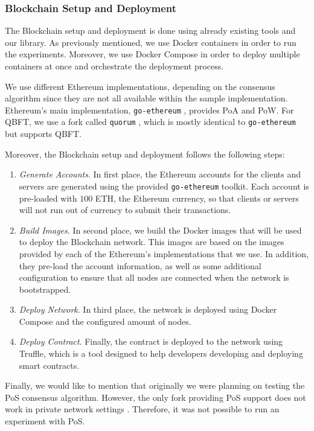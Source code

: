 \subsubsection{Blockchain Setup and Deployment}

The Blockchain setup and deployment is done using already existing tools and our library. As previously mentioned, we use Docker containers in order to run the experiments. Moreover, we use Docker Compose in order to deploy multiple containers at once and orchestrate the deployment process.

We use different Ethereum implementations, depending on the consensus algorithm since they are not all available within the sample implementation. Ethereum's main implementation, \texttt{go-ethereum} \cite{go-ethereum}, provides PoA and PoW. For QBFT, we use a fork called \texttt{quorum} \cite{quorum}, which is mostly identical to \texttt{go-ethereum} but supports QBFT.

Moreover, the Blockchain setup and deployment follows the following steps:

\begin{enumerate}
    \item \textit{Generate Accounts}. In first place, the Ethereum accounts for the clients and servers are generated using the provided \texttt{go-ethereum} toolkit. Each account is pre-loaded with $100$ ETH, the Ethereum currency, so that clients or servers will not run out of currency to submit their transactions.
    
    \item \textit{Build Images}. In second place, we build the Docker images that will be used to deploy the Blockchain network. This images are based on the images provided by each of the Ethereum's implementations that we use. In addition, they pre-load the account information, as well as some additional configuration to ensure that all nodes are connected when the network is bootstrapped.
    
    \item \textit{Deploy Network}. In third place, the network is deployed using Docker Compose and the configured amount of nodes.
    
    \item \textit{Deploy Contract}. Finally, the contract is deployed to the network using Truffle, which is a tool designed to help developers developing and deploying smart contracts.
\end{enumerate}

Finally, we would like to mention that originally we were planning on testing the PoS consensus algorithm. However, the only fork providing PoS support does not work in private network settings \cite{issuePos}. Therefore, it was not possible to run an experiment with PoS.

